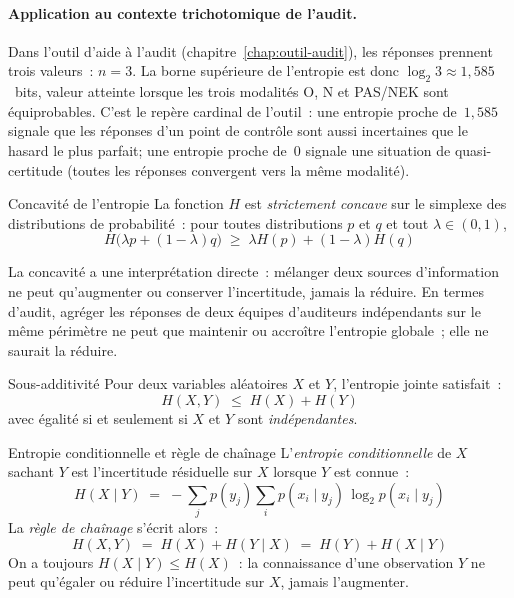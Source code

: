 \paragraph{Application au contexte trichotomique de l'audit.}
Dans l'outil d'aide à l'audit (chapitre~\ref{chap:outil-audit}), les réponses
prennent trois valeurs~: $n = 3$. La borne supérieure de l'entropie est donc
$\log_2 3 \approx 1{,}585$~bits, valeur atteinte lorsque les trois modalités O, N
et PAS/NEK sont équiprobables. C'est le repère cardinal de l'outil~: une entropie
proche de~$1{,}585$ signale que les réponses d'un point de contrôle sont aussi
incertaines que le hasard le plus parfait; une entropie proche de~0 signale une
situation de quasi-certitude (toutes les réponses convergent vers la même
modalité).

\begin{boiteTheoreme}{Concavité de l'entropie}
La fonction $H$ est \emph{strictement concave} sur le simplexe des distributions
de probabilité~: pour toutes distributions $p$ et $q$ et tout $\lambda \in (0,1)$,
\begin{equation}
  H\bigl(\lambda p + (1-\lambda) q\bigr) \;\geq\; \lambda H(p) + (1-\lambda) H(q)
  \label{eq:concavite}
\end{equation}
\end{boiteTheoreme}

La concavité a une interprétation directe~: mélanger deux sources d'information
ne peut qu'augmenter ou conserver l'incertitude, jamais la réduire. En termes
d'audit, agréger les réponses de deux équipes d'auditeurs indépendants sur le même
périmètre ne peut que maintenir ou accroître l'entropie globale~; elle ne saurait
la réduire.

\begin{boiteTheoreme}{Sous-additivité}
Pour deux variables aléatoires $X$ et $Y$, l'entropie jointe satisfait~:
\begin{equation}
  H(X, Y) \;\leq\; H(X) + H(Y)
  \label{eq:sous-additivite}
\end{equation}
avec égalité si et seulement si $X$ et $Y$ sont \emph{indépendantes}.
\end{boiteTheoreme}

\begin{boiteTheoreme}{Entropie conditionnelle et règle de chaînage}
L'\emph{entropie conditionnelle} de $X$ sachant $Y$ est l'incertitude résiduelle
sur $X$ lorsque $Y$ est connue~:
\begin{equation}
  H(X \mid Y) \;=\; -\sum_{j} p(y_j) \sum_{i} p(x_i \mid y_j)\,\log_2 p(x_i \mid y_j)
  \label{eq:entropie-cond}
\end{equation}
La \emph{règle de chaînage} s'écrit alors~:
\begin{equation}
  H(X, Y) \;=\; H(X) + H(Y \mid X) \;=\; H(Y) + H(X \mid Y)
  \label{eq:chainage}
\end{equation}
On a toujours $H(X \mid Y) \leq H(X)$~: la connaissance d'une observation $Y$
ne peut qu'égaler ou réduire l'incertitude sur $X$, jamais l'augmenter.
\end{boiteTheoreme}

